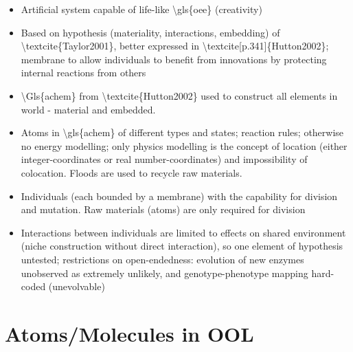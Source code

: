 		\begin{itemize}
			\item
			
			Artificial system capable of life-like \textbackslash{}gls\{oee\}
			(creativity)
			
			\item
			
			Based on hypothesis (materiality, interactions, embedding) of
			\textbackslash{}textcite\{Taylor2001\}, better expressed in
			\textbackslash{}textcite{[}p.341{]}\{Hutton2002\}; membrane to allow
			individuals to benefit from innovations by protecting internal
			reactions from others
			
			\item
			
			\textbackslash{}Gls\{achem\} from
			\textbackslash{}textcite\{Hutton2002\} used to construct all elements
			in world - material and embedded.
			
			\item
			
			Atoms in \textbackslash{}gls\{achem\} of different types and states;
			reaction rules; otherwise no energy modelling; only physics modelling
			is the concept of location (either integer-coordinates or real
			number-coordinates) and impossibility of colocation. Floods are used
			to recycle raw materials.
			
			\item
			
			Individuals (each bounded by a membrane) with the capability for
			division and mutation. Raw materials (atoms) are only required for
			division
			
			\item
			
			Interactions between individuals are limited to effects on shared
			environment (niche construction without direct interaction), so one
			element of hypothesis untested; restrictions on open-endedness:
			evolution of new enzymes unobserved as extremely unlikely, and
			genotype-phenotype mapping hard-coded (unevolvable)
			
		\end{itemize}
		
		\hypertarget{atomsmolecules-in-ool}{\section{Atoms/Molecules in
				OOL}\label{atomsmolecules-in-ool}}
		
